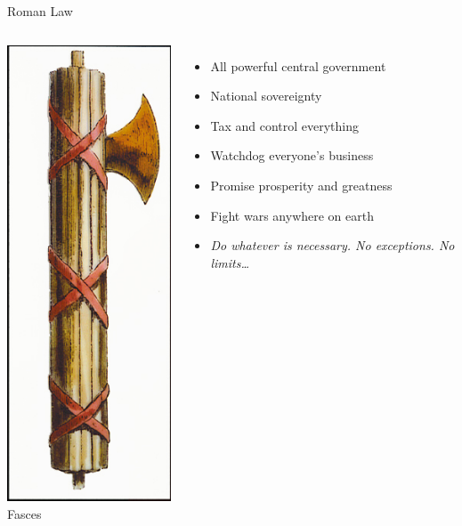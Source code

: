 \begin{frame}{Roman Law}
    \begin{columns}[onlytextwidth]
            \centering
            \includegraphics[height=0.55\textheight]{img/fasces-copy.jpg} \\
            Fasces \\

            \begin{itemize}
                \item All powerful central government
                \item National sovereignty
                \item Tax and control everything
                \item Watchdog everyone's business
                \item Promise prosperity and greatness
                \item Fight wars anywhere on earth
                \pause
                \item \emph{Do whatever is necessary. No exceptions. No limits\ldots}
            \end{itemize}
    \end{columns}
\end{frame}


